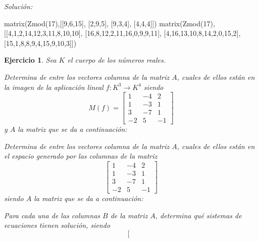 \documentclass[12pt]{amsart}
\newtheorem{ejer}{Ejercicio}
\begin{document}
{\it Soluci\'on:}

\begin{sageblock}
matrix(Zmod(17),[[9,6,15],
[2,9,5],
[9,3,4],
[4,4,4]])
matrix(Zmod(17),[[4,1,2,14,12,3,11,8,10,10],
[16,8,12,2,11,16,0,9,9,11],
[4,16,13,10,8,14,2,0,15,2],
[15,1,8,8,9,4,15,9,10,3]])
\end{sageblock}



\begin{ejer} Sea $K$ el cuerpo de los n\'umeros reales.
\newline
\noindent\begin{minipage}{\textwidth}
\begin{tcolorbox}[colback = green!20!white,title=Versión Núcleo]
Determina de entre los vectores columna de la matriz $A$, cuales de ellos están en la imagen de la aplicación lineal $f:K^{3} \to K^{4}$ siendo  $$ M(f) = \left[\begin{array}{rrr}
1 & -4 & 2 \\
1 & -3 & 1 \\
3 & -7 & 1 \\
-2 & 5 & -1
\end{array}\right] $$ y $A$ la matriz que se da a continuación:\end{tcolorbox}
\end{minipage} \newline
\noindent\begin{minipage}{\textwidth}
\begin{tcolorbox}[colback = blue!20!white,title=Versión Anulador]
Determina de entre los vectores columna de la matriz $A$, cuales de ellos están en el espacio generado por las columnas de la matriz $$ \left[\begin{array}{rrr}
1 & -4 & 2 \\
1 & -3 & 1 \\
3 & -7 & 1 \\
-2 & 5 & -1
\end{array}\right] $$ siendo $A$ la matriz que se da a continuación:\end{tcolorbox}
\end{minipage} \newline
\noindent\begin{minipage}{\textwidth} 
\begin{tcolorbox}[colback = red!20!white,title=Versión Ecuaciones Implícitas]
Para cada una de las columnas $B$ de la matriz $A$, determina qué sistemas de ecuaciones tienen solución, siendo $$ \left[\begin{array}{rrr}

\end{array}$$
\end{tcolorbox}
\end{minipage}
\end{ejer}
\end{document}
